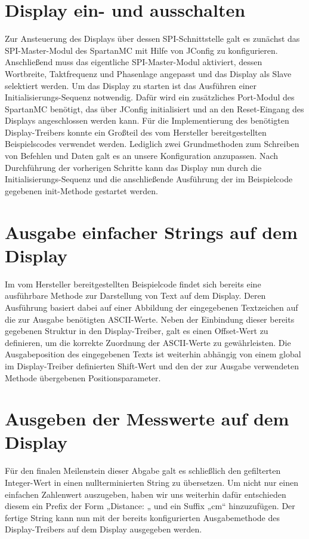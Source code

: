 \documentclass[parskip,
							 oneside,
							 11pt,
							 noheadingspace,
							 accentcolor=tud1d,
							 bigchapter,
							 colorback]{tudreport}
\begin{document}
\section{Display ein- und ausschalten}
 Zur Ansteuerung des Displays über dessen SPI-Schnittstelle galt es zunächst das SPI-Master-Modul des SpartanMC mit Hilfe von JConfig zu konfigurieren.  
 Anschließend muss das eigentliche SPI-Master-Modul aktiviert, dessen Wortbreite, Taktfrequenz und Phasenlage angepasst und das Display als Slave selektiert werden.  
 Um das Display zu starten ist das Ausführen einer Initialisierungs-Sequenz notwendig. Dafür wird ein zusätzliches Port-Modul des SpartanMC benötigt, das über JConfig initialisiert und an den Reset-Eingang des Displays angeschlossen werden kann.
  Für die Implementierung des benötigten Display-Treibers konnte ein Großteil des vom Hersteller bereitgestellten Beispielscodes verwendet werden. Lediglich zwei Grundmethoden zum Schreiben von Befehlen und Daten galt es an unsere Konfiguration anzupassen. 
 Nach Durchführung der vorherigen Schritte kann das Display nun durch die Initialisierungs-Sequenz und die anschließende Ausführung der im Beispielcode gegebenen init-Methode gestartet werden.

\section{Ausgabe einfacher Strings auf dem Display}
 Im vom Hersteller bereitgestellten Beispielcode findet sich bereits eine ausführbare Methode zur Darstellung von Text auf dem Display. Deren Ausführung basiert dabei auf einer Abbildung der eingegebenen Textzeichen auf die zur Ausgabe benötigten ASCII-Werte. Neben der Einbindung dieser bereits gegebenen Struktur in den Display-Treiber, galt es einen Offset-Wert zu definieren, um die korrekte Zuordnung der ASCII-Werte zu gewährleisten. Die Ausgabeposition des eingegebenen Texts ist weiterhin abhängig von einem global im Display-Treiber definierten Shift-Wert und den der zur Ausgabe verwendeten Methode übergebenen Positionsparameter.
\section{Ausgeben der Messwerte auf dem Display}
 Für den finalen Meilenstein dieser Abgabe galt es schließlich den gefilterten Integer-Wert in einen nullterminierten String zu übersetzen. Um nicht nur einen einfachen Zahlenwert auszugeben, haben wir uns weiterhin dafür entschieden diesem ein Prefix der Form „Distance: „ und ein Suffix „cm“ hinzuzufügen. Der fertige String kann nun mit der bereits konfigurierten Ausgabemethode des Display-Treibers auf dem Display ausgegeben werden.
\end{document}
